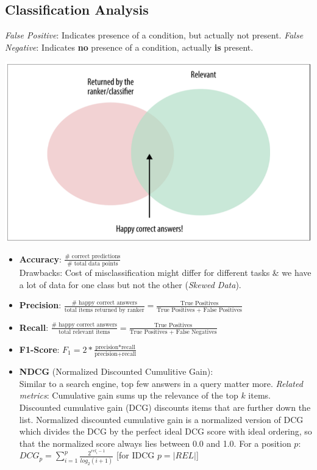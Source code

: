 \documentclass[english]{latex4ei/latex4ei_sheet}
\begin{document}
\begin{sectionbox}
\subsection{Classification Analysis}
\emph{False Positive}: Indicates presence of a condition, but actually not present.
\emph{False Negative}: Indicates \textbf{no} presence of a condition, actually \textbf{is} present.
\begin{center}
	\includegraphics[width = 1.0\columnwidth]{figures/precession_recall.png}
\end{center}
\begin{itemize}
    \item \textbf{Accuracy}: $\frac{\text{# correct predictions}}{\text{# total data points}}$\\
    Drawbacks: Cost of misclassification might differ for different tasks \& we have a lot of data for one class but not the other (\emph{Skewed Data}).
    \item \textbf{Precision}: $\frac{\text{# happy correct answers}}{\text{total items returned by ranker}} = \frac{\text{True Positives}}{\text{True Positives + False Positives}}$
    \item \textbf{Recall}: $\frac{\text{# happy correct answers}}{\text{total relevant items}} = \frac{\text{True Positives}}{\text{True Positives + False Negatives}}$
    \item \textbf{F1-Score}: $F_1= 2*\frac{\text{precision*recall}}{\text{precision+recall}}$
    \item \textbf{NDCG} (Normalized Discounted Cumulitive Gain):\\
    Similar to a search engine, top few answers in a query matter more.
    \emph{Related metrics}: Cumulative gain sums up the relevance of the top $k$ items. Discounted cumulative gain (DCG) discounts items that are further down the list. Normalized discounted cumulative gain is a normalized version of DCG which divides the DCG by the perfect ideal  DCG score with ideal ordering, so that the normalized score always lies between 0.0 and 1.0. For a position $p$:
    $DCG_p=\sum_{i=1}^p\frac{2^{rel_i-1}}{log_2(i+1)}$ \hspace{5}[for IDCG $p=|REL|$]
\end{itemize}

\end{sectionbox}
\end{document}

